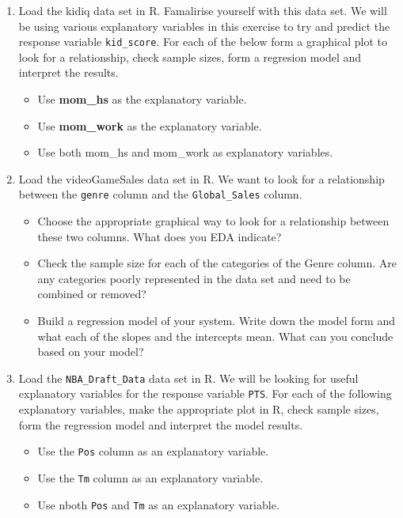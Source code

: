 \documentclass[
]{book}
\providecommand{\tightlist}{%
  \setlength{\itemsep}{0pt}\setlength{\parskip}{0pt}}
\theoremstyle{definition}
\theoremstyle{definition}
\theoremstyle{definition}
\theoremstyle{definition}
\theoremstyle{remark}
\begin{document}
\begin{enumerate}
\def\labelenumi{\arabic{enumi}.}
\item
  Load the kidiq data set in R. Famalirise yourself with this data set. We will be using various explanatory variables in this exercise to try and predict the response variable \texttt{kid\_score}. For each of the below form a graphical plot to look for a relationship, check sample sizes, form a regresion model and interpret the results.

  \begin{itemize}
  \tightlist
  \item
    Use \textbf{mom\_hs} as the explanatory variable.
  \item
    Use \textbf{mom\_work} as the explanatory variable.
  \item
    Use both mom\_hs and mom\_work as explanatory variables.
  \end{itemize}
\item
  Load the videoGameSales data set in R. We want to look for a relationship between the \texttt{genre} column and the \texttt{Global\_Sales} column.

  \begin{itemize}
  \tightlist
  \item
    Choose the appropriate graphical way to look for a relationship between these two columns. What does you EDA indicate?
  \item
    Check the sample size for each of the categories of the Genre column. Are any categories poorly represented in the data set and need to be combined or removed?
  \item
    Build a regression model of your system. Write down the model form and what each of the slopes and the intercepts mean. What can you conclude based on your model?
  \end{itemize}
\item
  Load the \texttt{NBA\_Draft\_Data} data set in R. We will be looking for useful explanatory variables for the response variable \texttt{PTS}. For each of the following explanatory variables, make the appropriate plot in R, check sample sizes, form the regression model and interpret the model results.

  \begin{itemize}
  \tightlist
  \item
    Use the \texttt{Pos} column as an explanatory variable.
  \item
    Use the \texttt{Tm} column as an explanatory variable.
  \item
    Use nboth \texttt{Pos} and \texttt{Tm} as an explanatory variable.
  \end{itemize}
\end{enumerate}
\end{document}
